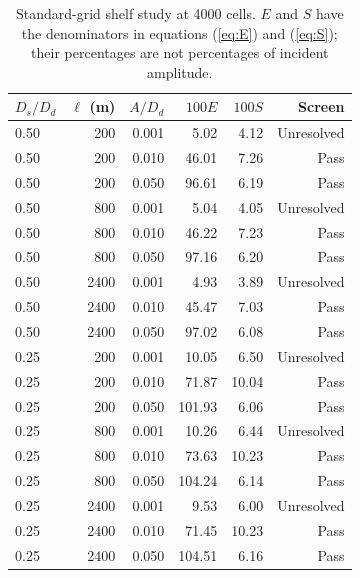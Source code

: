 \begin{table}[htbp]\centering\small
\begin{tabular}{lrrrrr}\toprule
$D_s/D_d$ & $\ell$ (m) & $A/D_d$ & $100E$ & $100S$ & Screen \\
\midrule
0.50 & 200 & 0.001 & 5.02 & 4.12 & Unresolved \\
0.50 & 200 & 0.010 & 46.01 & 7.26 & Pass \\
0.50 & 200 & 0.050 & 96.61 & 6.19 & Pass \\
0.50 & 800 & 0.001 & 5.04 & 4.05 & Unresolved \\
0.50 & 800 & 0.010 & 46.22 & 7.23 & Pass \\
0.50 & 800 & 0.050 & 97.16 & 6.20 & Pass \\
0.50 & 2400 & 0.001 & 4.93 & 3.89 & Unresolved \\
0.50 & 2400 & 0.010 & 45.47 & 7.03 & Pass \\
0.50 & 2400 & 0.050 & 97.02 & 6.08 & Pass \\
0.25 & 200 & 0.001 & 10.05 & 6.50 & Unresolved \\
0.25 & 200 & 0.010 & 71.87 & 10.04 & Pass \\
0.25 & 200 & 0.050 & 101.93 & 6.06 & Pass \\
0.25 & 800 & 0.001 & 10.26 & 6.44 & Unresolved \\
0.25 & 800 & 0.010 & 73.63 & 10.23 & Pass \\
0.25 & 800 & 0.050 & 104.24 & 6.14 & Pass \\
0.25 & 2400 & 0.001 & 9.53 & 6.00 & Unresolved \\
0.25 & 2400 & 0.010 & 71.45 & 10.23 & Pass \\
0.25 & 2400 & 0.050 & 104.51 & 6.16 & Pass \\
\bottomrule\end{tabular}
\caption{Standard-grid shelf study at 4000 cells. $E$ and $S$ have the denominators in equations (\ref{eq:E}) and (\ref{eq:S}); their percentages are not percentages of incident amplitude.}\end{table}

